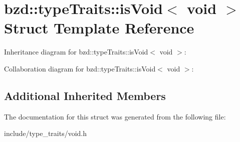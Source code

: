 \hypertarget{structbzd_1_1typeTraits_1_1isVoid_3_01void_01_4}{}\section{bzd\+:\+:type\+Traits\+:\+:is\+Void$<$ void $>$ Struct Template Reference}
\label{structbzd_1_1typeTraits_1_1isVoid_3_01void_01_4}


Inheritance diagram for bzd\+:\+:type\+Traits\+:\+:is\+Void$<$ void $>$\+:


Collaboration diagram for bzd\+:\+:type\+Traits\+:\+:is\+Void$<$ void $>$\+:
\subsection*{Additional Inherited Members}


The documentation for this struct was generated from the following file\+:\begin{DoxyCompactItemize}
\item 
include/type\+\_\+traits/void.\+h\end{DoxyCompactItemize}
